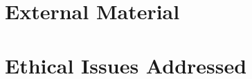 \begin{appendices}
\chapter{External Material}
\lipsum[3-3]
\chapter{Ethical Issues Addressed}
\end{appendices}